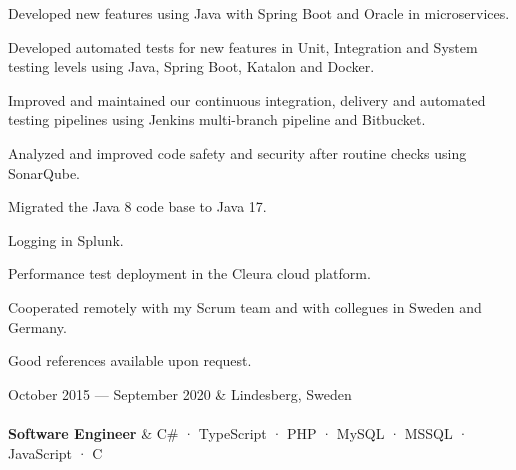 \documentclass{cv-stylish}
\begin{document}
\begin{center}
\begin{InfoBody}
\begin{compactitem}
  \item Developed new features using Java with Spring Boot and Oracle in
    microservices.
  \item Developed automated tests for new features in Unit, Integration and
    System testing levels using Java, Spring Boot, Katalon and Docker.
  \item Improved and maintained our continuous integration, delivery
    and automated testing pipelines using Jenkins multi-branch
    pipeline and Bitbucket.
  \item Analyzed and improved code safety and security after routine
    checks using SonarQube.
  \item Migrated the Java 8 code base to Java 17.
  \item Logging in Splunk.
  \item Performance test deployment in the Cleura cloud platform.
  \item Cooperated remotely with my Scrum team and with collegues in
    Sweden and Germany.
\end{compactitem}
Good references available upon request.
\end{InfoBody}

\vspace{1em}
\begin{JobTable}
  October 2015 --- September 2020 & \hfill Lindesberg, Sweden \\[3pt]
   \\[3pt]
  \hspace{5mm} \textbf{Software Engineer}
  & \hfill C\# · TypeScript · PHP · MySQL · MSSQL · JavaScript · C \\
\end{JobTable}
\begin{InfoBody}


\end{InfoBody}
\end{center}
\end{document}
